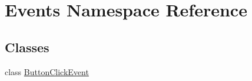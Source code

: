 \hypertarget{namespaceEvents}{}\section{Events Namespace Reference}
\label{namespaceEvents}
\subsection*{Classes}
\begin{DoxyCompactItemize}
\item 
class \hyperlink{classEvents_1_1ButtonClickEvent}{Button\+Click\+Event}
\end{DoxyCompactItemize}
